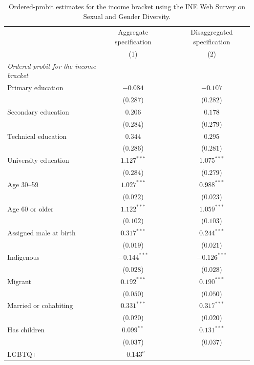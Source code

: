 \begin{table}[H]
\begin{center}
\begin{threeparttable}
\captionsetup{margin=0.5cm}
\caption{Ordered-probit estimates for the income bracket using the INE Web Survey on Sexual and Gender Diversity.}
\label{tab:ine_ordered_probit}
\footnotesize
\centering
\begin{tabular}{lccc}
\toprule
 & \multicolumn{1}{c}{Aggregate specification} & & \multicolumn{1}{c}{Disaggregated specification} \\ 
 & (1) & & (2) \\ \midrule
\textit{Ordered probit for the income bracket} & &  &  \\ 
Primary education & $-0.084$ & & $-0.107$ \\ 
 & ($0.287$) & & ($0.282$) \\ 
Secondary education & $0.206$ & & $0.178$ \\ 
 & ($0.284$) & & ($0.279$) \\ 
Technical education & $0.344$ & & $0.295$ \\ 
 & ($0.286$) & & ($0.281$) \\ 
University education & $1.127^{***}$ & & $1.075^{***}$ \\ 
 & ($0.284$) & & ($0.279$) \\ 
Age 30--59 & $1.027^{***}$ & & $0.988^{***}$ \\ 
 & ($0.022$) & & ($0.023$) \\ 
Age 60 or older & $1.122^{***}$ & & $1.059^{***}$ \\ 
 & ($0.102$) & & ($0.103$) \\ 
Assigned male at birth & $0.317^{***}$ & & $0.244^{***}$ \\ 
 & ($0.019$) & & ($0.021$) \\ 
Indigenous & $-0.144^{***}$ & & $-0.126^{***}$ \\ 
 & ($0.028$) & & ($0.028$) \\ 
Migrant & $0.192^{***}$ & & $0.190^{***}$ \\ 
 & ($0.050$) & & ($0.050$) \\ 
Married or cohabiting & $0.331^{***}$ & & $0.317^{***}$ \\ 
 & ($0.020$) & & ($0.020$) \\ 
Has children & $0.099^{**}$ & & $0.131^{***}$ \\ 
 & ($0.037$) & & ($0.037$) \\ 
LGBTQ+ & $-0.143^{o}$ & &  \\ 

\end{tabular}
\end{threeparttable}
\end{center}
\end{table}
